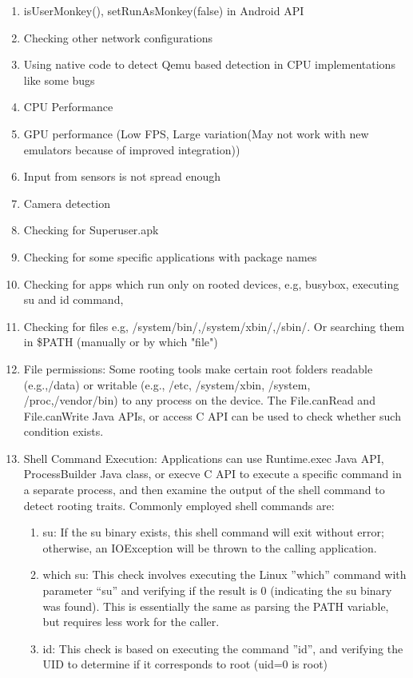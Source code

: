 \documentclass[../main.tex]{subfile}
\begin{document}
\begin{enumerate}
		\item isUserMonkey(), setRunAsMonkey(false) in Android API
		\item Checking other network configurations
		\item Using native code to detect Qemu based detection in CPU implementations like some bugs
		\item CPU Performance \cite{vidas2014evading}
		\item GPU performance (Low FPS, Large variation(May not work with new emulators because of improved integration)) \cite{vidas2014evading}
		\item Input from sensors is not spread enough \cite{vidas2014evading}
		\item Camera detection \cite{vidas2014evading}
		\item Checking for Superuser.apk
		\item Checking for some specific applications with package names  \cite{vidas2014evading}
		\item Checking for apps which run only on rooted devices, e.g, busybox, executing su and id command, \cite{vidas2014evading}
		\item Checking for files e.g, /system/bin/,/system/xbin/,/sbin/. Or searching them in \$PATH (manually or by which "file")
		
		\item File permissions: Some rooting tools make certain root folders readable (e.g.,/data) or writable (e.g., /etc, /system/xbin, /system, /proc,/vendor/bin) to any process on the device. The File.canRead and File.canWrite Java APIs, or access C API can be used to check whether such condition exists.
		\item Shell Command Execution: Applications can use Runtime.exec Java API, ProcessBuilder Java class, or execve C API to execute a specific command in a separate process, and then examine the output of the shell command to detect rooting traits. Commonly employed shell commands are:
		\begin{enumerate}
			\item su: If the su binary exists, this shell command will exit without error; otherwise, an IOException will be thrown to the calling application.
			\item which su: This check involves executing the Linux ”which” command with parameter “su” and verifying if the result is 0 (indicating the su binary was found). This is essentially the same as parsing the PATH variable, but requires less work for the caller.
			\item id: This check is based on executing the command ”id”, and verifying the UID to determine if it corresponds to root (uid=0 is root)
		\end{enumerate}
	

\end{enumerate}
\end{document}
